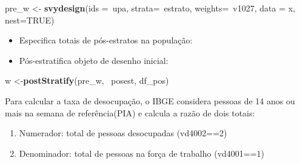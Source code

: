 \documentclass[]{book}
\newenvironment{Shaded}{\begin{snugshade}}{\end{snugshade}}
\newcommand{\KeywordTok}[1]{\textcolor[rgb]{0.13,0.29,0.53}{\textbf{{#1}}}}
\newcommand{\DataTypeTok}[1]{\textcolor[rgb]{0.13,0.29,0.53}{{#1}}}
\newcommand{\StringTok}[1]{\textcolor[rgb]{0.31,0.60,0.02}{{#1}}}
\newcommand{\OtherTok}[1]{\textcolor[rgb]{0.56,0.35,0.01}{{#1}}}
\newcommand{\NormalTok}[1]{{#1}}
\providecommand{\tightlist}{%
  \setlength{\itemsep}{0pt}\setlength{\parskip}{0pt}}
\numberwithin{example}{chapter}
\numberwithin{remark}{chapter}
\numberwithin{definition}{chapter}
\begin{document}
\begin{Shaded}
\begin{Highlighting}[]
\NormalTok{pre_w <-}\StringTok{ }\KeywordTok{svydesign}\NormalTok{(}\DataTypeTok{ids =}\NormalTok{~upa, }\DataTypeTok{strata=}\NormalTok{~estrato, }
  \DataTypeTok{weights=}\NormalTok{~v1027, }\DataTypeTok{data =} \NormalTok{x, }\DataTypeTok{nest=}\OtherTok{TRUE}\NormalTok{)}
\end{Highlighting}
\end{Shaded}

\begin{itemize}
\tightlist
\item
  Especifica totais de pós-estratos na população:
\end{itemize}

\begin{Shaded}
\end{Shaded}

\begin{itemize}
\tightlist
\item
  Pós-estratifica objeto de desenho inicial:
\end{itemize}

\begin{Shaded}
\begin{Highlighting}[]
\NormalTok{w <-}\KeywordTok{postStratify}\NormalTok{(pre_w, ~posest, df_pos)}
\end{Highlighting}
\end{Shaded}

Para calcular a taxa de desocupação, o IBGE considera pessoas de 14 anos
ou mais na semana de referência(PIA) e calcula a razão de dois totais:

\begin{enumerate}
\def\labelenumi{\arabic{enumi}.}
\item
  Numerador: total de pessoas desocupadas (vd4002==2)
\item
  Denominador: total de pessoas na força de trabalho (vd4001==1)
\end{enumerate}
\end{document}
